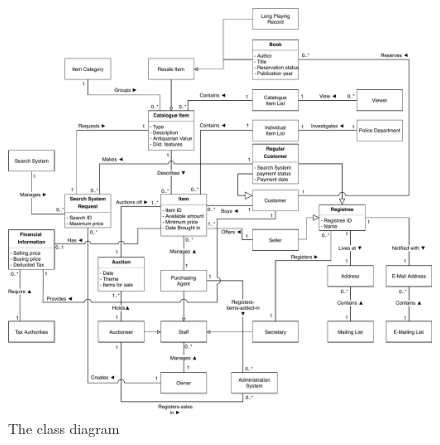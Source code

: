 \documentclass{article}
\begin{document}
\begin{figure}[H]
	\centering
	\includegraphics[scale=.95]{uml/domainmodelUPD3.pdf}
	\caption*{The class diagram}
\end{figure}
\end{document}
